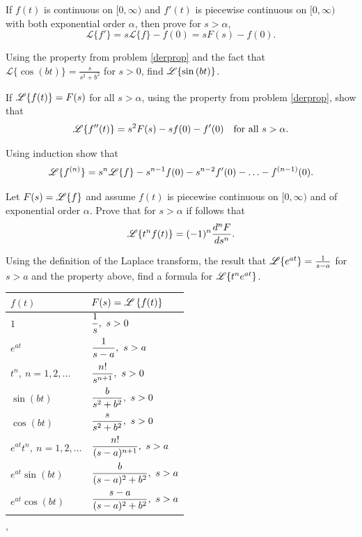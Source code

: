 \begin{enumerate}[resume]
\ii If $f(t)$ is continuous on $\lbrack 0, \infty )$ and $f'(t)$ is piecewise continuous on $\lbrack 0, \infty )$ with
both exponential order $\alpha$, then prove for $s > \alpha$,
\[ \mathscr{L} \{ f' \} = s \mathscr{L}\{ f \} - f(0) = sF(s)-f(0).\] \label{derprop}

\vfill

\clearpage

\ii Using the property from problem \ref{derprop} and the fact that $\mathscr{L} \{ \cos{(bt)} \} = \frac{s}{s^2+b^2}$ for $s >0$, find
$\mathscr{L} \{ \sin{(bt)} \}$. \vfill

\ii If $\mathscr{L} \{ f(t) \} = F(s)$ for all $s > \alpha$, using the property from problem \ref{derprop}, show that
\[ \mathscr{L} \{ f''(t) \} =s^2F(s)-sf(0)-f'(0) \quad \mbox{for all } s > \alpha .\]  \vfill


\ii Using induction show that
\[ \mathscr{L} \{ f^{(n)} \} = s^n \mathscr{L} \{ f \} - s^{n-1} f(0) - s^{n-2} f'(0) - \ldots - f^{(n-1)}(0).\] \bs

\clearpage

\ii Let $F(s) = \mathscr{L} \{ f \}$ and assume $f(t)$ is piecewise continuous on $\lbrack 0, \infty )$ and of exponential order $\alpha$.
Prove that for $s > \alpha$ if follows that
\[ \mathscr{L} \{ t^nf(t) \} = (-1)^n \frac{d^nF}{ds^n}.\] \vfill


\ii Using the definition of the Laplace transform, the result that $\mathscr{L} \{ e^{at} \} = \frac{1}{s-a}$ for $s>a$ and the property above, find a formula for  $\mathscr{L} \{ t^n e^{at} \}$. \vfill
\end{enumerate}

\clearpage


\begin{center}
\begin{tabular}{|l|l|}
\hline
$f(t)$ & $F(s) = \mathscr{L} \left\{ f(t) \right\}$ \\
\hline
$1$ & $\displaystyle \frac{1}{s}, \ s > 0$\\
\hline
$e^{at}$ & $\displaystyle \frac{1}{s-a}, \ s > a$\\
\hline
$t^n, \ n=1,2, \ldots$ & $\displaystyle \frac{n!}{s^{n+1}}, \ s > 0$\\
\hline
$\sin{(bt)}$ & $\displaystyle \frac{b}{s^2+b^2}, \ s > 0$\\
\hline
$\cos{(bt)}$ & $\displaystyle \frac{s}{s^2+b^2}, \ s > 0$\\
\hline
$e^{at}t^n, \ n=1,2, \ldots$ & $\displaystyle \frac{n!}{(s-a)^{n+1}}, \ s > a$\\
\hline
$e^{at}\sin{(bt)}$ & $\displaystyle \frac{b}{(s-a)^2+b^2}, \ s > a$\\
\hline
$e^{at}\cos{(bt)}$ & $\displaystyle \frac{s-a}{(s-a)^2+b^2}, \ s > a$\\
\hline
\end{tabular}
\end{center}
'
\bs

